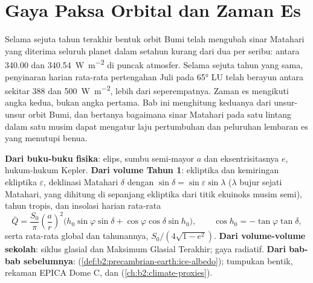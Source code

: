 \chapter{Gaya Paksa Orbital dan Zaman Es}\label{ch:b2:orbital-forcing}

Selama sejuta tahun terakhir bentuk orbit Bumi telah mengubah sinar Matahari yang diterima
seluruh planet dalam setahun kurang dari dua per seribu: antara \num{340.00} dan
\qty{340.54}{W.m^{-2}} di puncak atmosfer. Selama sejuta tahun yang sama, penyinaran harian rata-rata
pertengahan Juli pada \ang{65} LU telah berayun antara sekitar 388 dan \qty{500}{W.m^{-2}}, lebih dari
seperempatnya. Zaman es mengikuti angka kedua, bukan angka pertama. Bab ini menghitung keduanya
dari unsur-unsur orbit Bumi, dan bertanya bagaimana sinar Matahari pada satu lintang dalam satu musim dapat
mengatur laju pertumbuhan dan peluruhan lembaran es yang menutupi benua.

\begin{recall}
\textbf{Dari buku-buku fisika}: elips, sumbu semi-mayor $a$ dan eksentrisitasnya $e$, hukum-hukum
Kepler. \textbf{Dari volume Tahun 1}: ekliptika dan kemiringan ekliptika $\varepsilon$, deklinasi
Matahari $\delta$ dengan $\sin\delta = \sin\varepsilon\sin\lambda$ ($\lambda$ bujur sejati
Matahari, yang dihitung di sepanjang ekliptika dari titik ekuinoks musim semi), tahun tropis, dan insolasi
harian rata-rata
\[
  \bar Q = \frac{S_0}{\pi}\left(\frac{a}{r}\right)^{2}\bigl(h_0\sin\varphi\sin\delta +
  \cos\varphi\cos\delta\sin h_0\bigr),\qquad \cos h_0 = -\tan\varphi\tan\delta ,
\]
serta rata-rata global dan tahunannya, $S_0/(4\sqrt{1 - e^2})$. \textbf{Dari volume-volume sekolah}:
siklus glasial dan Maksimum Glasial Terakhir; gaya radiatif. \textbf{Dari bab-bab sebelumnya}:
 (\cref{def:b2:precambrian-earth:ice-albedo}); tumpukan bentik, rekaman EPICA
Dome C, dan  (\cref{ch:b2:climate-proxies}).
\end{recall}

